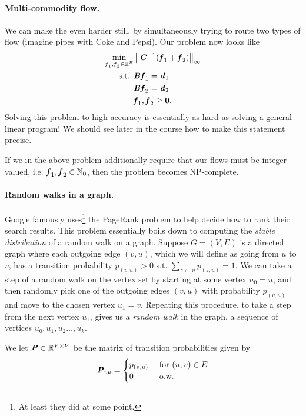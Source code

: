 \paragraph{Multi-commodity flow.}
We can make the even harder still, by simultaneously trying to route
two types of flow (imagine pipes with Coke and Pepsi).
Our problem now looks like
\begin{align*}
\min_{\boldsymbol{\mathit{f}}_1, \boldsymbol{\mathit{f}}_2 \in \mathbb{R}^E } & \left\| \boldsymbol{\mathit{C}}^{-1} (\boldsymbol{\mathit{f}}_1 + \boldsymbol{\mathit{f}}_2) \right\|_{\infty} \\
  \textrm{s.t. } &  \boldsymbol{\mathit{B}} \boldsymbol{\mathit{f}}_1 = \boldsymbol{\mathit{d}}_1 \\
                              & \boldsymbol{\mathit{B}} \boldsymbol{\mathit{f}}_2 = \boldsymbol{\mathit{d}}_2\\
                     &  \boldsymbol{\mathit{f}}_1, \boldsymbol{\mathit{f}}_2 \geq \boldsymbol{0}.
\end{align*}
Solving this problem to high accuracy is essentially as hard as
solving a general linear program! We should see later in the course
how to make this statement precise.

If we in the above problem additionally require that our flows must be
integer valued, i.e. $\boldsymbol{\mathit{f}}_1, \boldsymbol{\mathit{f}}_2 \in \mathbb{N}_{0}$, then the problem becomes NP-complete.

\paragraph{Random walks in a graph.}
Google famously uses\footnote{At least they did at some point.} the
PageRank problem to help decide how to rank their search results.
This problem essentially boils down to computing the \emph{stable
distribution} of a random walk on a graph.
Suppose $G=(V,E)$ is a directed graph where each outgoing edge
$(v,u)$, which we will define as going from $u$ to $v$, has a
transition probability $p_{(v,u)} > 0$ s.t. $\sum_{z \leftarrow u}
p_{(z,u)} = 1$.
We can take a step of a random walk on the vertex set by starting at some vertex
$u_0 = u$, and then randomly pick one of the outgoing edges
$(v,u)$ with probability $p_{(v,u)}$  and move to
the chosen vertex $u_1 = v$.  Repeating this procedure, to take a step from
the next vertex $u_1$, gives us a
\emph{random walk} in the graph, a sequence of vertices $u_0, u_1, u_2
\ldots, u_k$.

We let $\boldsymbol{\mathit{P}} \in \mathbb{R}^{V \times V}$ be the matrix of transition
probabilities given by
\[
  \boldsymbol{\mathit{P}}_{vu} =
  \begin{cases}
    p_{(v,u)} & \text{ for } (u,v) \in E \\
    0 & \text{ o.w.}
  \end{cases}
\]

